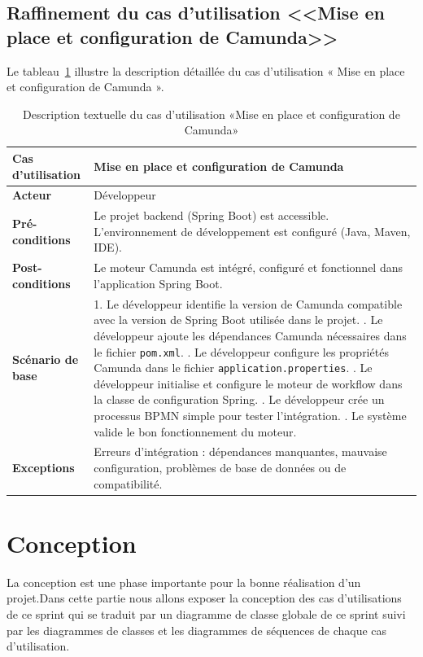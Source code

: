 \subsection{Raffinement du cas d'utilisation <<Mise en place et configuration de Camunda>>}
Le tableau~\ref{tab:confCamunda} illustre la description détaillée du cas d'utilisation « Mise en place et configuration de Camunda ».
\begin{table}[!h]
\centering
\caption{Description textuelle du cas d’utilisation «Mise en place et configuration de Camunda»}
\label{tab:confCamunda}
\renewcommand{\arraystretch}{1.2}
\begin{tabular}{|p{4.2cm}|p{11cm}|}
\hline
\textbf{Cas d'utilisation} & Mise en place et configuration de Camunda \\
\hline
\textbf{Acteur} & Développeur \\
\hline
\textbf{Pré-conditions} & 
Le projet backend (Spring Boot) est accessible. \newline
L’environnement de développement est configuré (Java, Maven, IDE). \\
\hline
\textbf{Post-conditions} & Le moteur Camunda est intégré, configuré et fonctionnel dans l’application Spring Boot. \\
\hline
\textbf{Scénario de base} & 
1. Le développeur identifie la version de Camunda compatible avec la version de Spring Boot utilisée dans le projet. \newline
2. Le développeur ajoute les dépendances Camunda nécessaires dans le fichier \texttt{pom.xml}. \newline
3. Le développeur configure les propriétés Camunda dans le fichier \texttt{application.properties}. \newline
4. Le développeur initialise et configure le moteur de workflow dans la classe de configuration Spring. \newline
5. Le développeur crée un processus BPMN simple pour tester l’intégration. \newline
6. Le système valide le bon fonctionnement du moteur. \\
\hline
\textbf{Exceptions} & 
Erreurs d’intégration : dépendances manquantes, mauvaise configuration, problèmes de base de données ou de compatibilité. \\
\hline
\end{tabular}
\end{table}
\newpage
\section{Conception}
La conception est une phase importante pour la bonne réalisation d'un projet.Dans cette partie nous allons exposer la conception des cas d'utilisations de ce sprint qui se traduit par un diagramme de classe globale de ce sprint suivi par les diagrammes de classes et les diagrammes de séquences de chaque cas d'utilisation.
